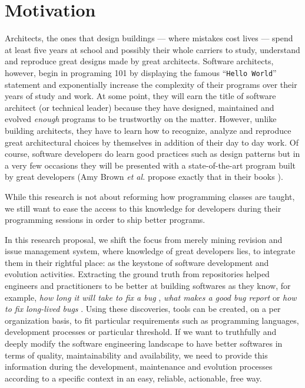 \documentclass[11pt,a4paper, cuthesis]{report}
\begin{document}









\section{Motivation}

Architects, the ones that design buildings --- where mistakes cost lives --- spend at least five years at school and possibly their whole carriers to study, understand and reproduce great designs made by great architects.
Software architects, however, begin in programing 101 by displaying the famous ``{\tt Hello World}'' statement and exponentially increase the complexity of their programs over their years of study and work.
At some point, they will earn the title of software architect (or technical leader) because they have designed, maintained and evolved {\it enough} programs to be trustworthy on the matter.
However, unlike building architects, they have to learn how to recognize, analyze and reproduce great architectural choices by themselves in addition of their day to day work.
Of course, software developers do learn good practices such as design patterns \cite{Gamma2008} but in a very few occasions they will be presented with a state-of-the-art program built by great developers (Amy Brown {\it et al.} propose exactly that in their books \cite{chansler2011architecture, AmyBrown2012, Armstrong2013}).

While this research is not about reforming how programming classes are taught, we still want to ease the access to this knowledge for developers during their programming sessions in order to ship better programs.

In this research proposal, we shift the focus from merely mining revision and issue management system, where knowledge of great developers lies, to integrate them in their rightful place: as the keystone of software development and evolution activities.
Extracting the ground truth from repositories helped engineers and practitioners to be better at building softwares as they know, for example, {\it how long it will take to fix a bug} \cite{Weiss2007}, {\it what makes a good bug report} \cite{Bettenburg2008} or {\it how to fix long-lived bugs} \cite{Saha2014}.
Using these discoveries, tools can be created, on a per organization basis, to fit particular requirements such as programming languages, development processes or particular threshold. If we want to truthfully and deeply modify the software engineering landscape to have better softwares in terms of quality, maintainability and availability, we need to provide this information during the development, maintenance and evolution processes according to a specific context in an easy, reliable, actionable, free way.
\end{document}
